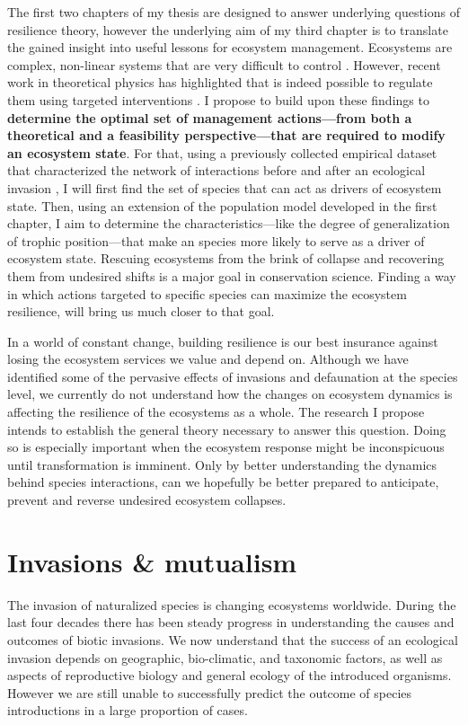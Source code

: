 \documentclass[a4paper]{article}
\begin{document}
The first two chapters of my thesis are designed to answer underlying questions of resilience theory, however the underlying aim of my third chapter is to translate the gained insight into useful lessons for ecosystem management.
Ecosystems are complex, non-linear systems that are very difficult to control .
However, recent work in theoretical physics has highlighted that is indeed possible to regulate them using targeted interventions \citep{Cornelius2013}.
I propose to build upon these findings to \textbf{determine the optimal set of management actions---from both a theoretical and a feasibility perspective---that are required to modify an ecosystem state}.
For that, using a previously collected empirical dataset that characterized the network of interactions before and after an ecological invasion \citep{Bartomeus2008}, I will first find the set of species that can act as drivers of ecosystem state.
Then, using an extension of the population model developed in the first chapter, I aim to determine the characteristics---like the degree of generalization of trophic position---that make an species more likely to serve as a driver of ecosystem state.
Rescuing ecosystems from the brink of collapse and recovering them from undesired shifts is a major goal in conservation science.
Finding a way in which actions targeted to specific species can maximize the ecosystem resilience, will bring us much closer to that goal.

In a world of constant change, building resilience is our best insurance against losing the ecosystem services we value and depend on.
Although we have identified some of the pervasive effects of invasions and defaunation at the species level, we currently do not understand how the changes on ecosystem dynamics is affecting the resilience of the ecosystems as a whole.
The research I propose intends to establish the general theory necessary to answer this question.
Doing so is especially important when the ecosystem response might be inconspicuous until transformation is imminent.
Only by better understanding the dynamics behind species interactions, can we hopefully be better prepared to anticipate, prevent and reverse undesired ecosystem collapses.

\chapter*{Invasions \& mutualism}

The invasion of naturalized species is changing ecosystems worldwide.
During the last four decades there has been steady progress in understanding the causes and outcomes of biotic invasions.
We now understand that the success of an ecological invasion depends on geographic, bio-climatic, and taxonomic factors, as well as aspects of reproductive biology and general ecology of the introduced organisms.
However we are still unable to successfully predict the outcome of species introductions in a large proportion of cases.
\end{document}
